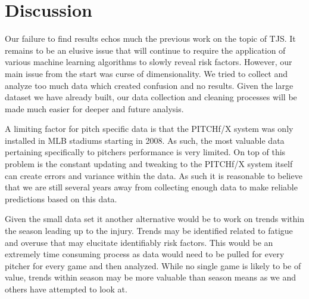 \section{Discussion}

Our failure to find results echos much the previous work on the topic of TJS. It remains to be an elusive issue that will continue to require the application of various machine learning algorithms to slowly reveal risk factors. However, our main issue from the start was curse of dimensionality. We tried to collect and analyze too much data which created confusion and no results. Given the large dataset we have already built, our data collection and cleaning processes will be made much easier for deeper and future analysis.

A limiting factor for pitch specific data is that the PITCHf/X system was only installed in MLB stadiums starting in 2008. As such, the most valuable data pertaining specifically to pitchers performance is very limited. On top of this problem is the constant updating and tweaking to the PITCHf/X system itself can create errors and variance within the data. As such it is reasonable to believe that we are still several years away from collecting enough data to make reliable predictions based on this data.

Given the small data set it another alternative would be to work on trends within the season leading up to the injury. Trends may be identified related to fatigue and overuse that may elucitate identifiably risk factors. This would be an extremely time consuming process as data would need to be pulled for every pitcher for every game and then analyzed. While no single game is likely to be of value, trends within season may be more valuable than season means as we and others have attempted to look at.

